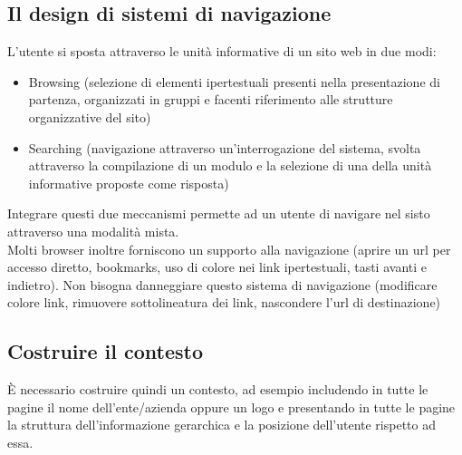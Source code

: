 \documentclass{article}
\begin{document}
\subsection{Il design di sistemi di navigazione}
L'utente si sposta attraverso le unità informative di un sito web in due modi:
\begin{itemize}
	\item Browsing (selezione di elementi ipertestuali presenti nella presentazione di partenza, organizzati in gruppi e facenti riferimento alle strutture organizzative del sito)
	\item Searching (navigazione attraverso un'interrogazione del sistema, svolta attraverso la compilazione di un modulo e la selezione di una della unità informative proposte come risposta)
\end{itemize}
Integrare questi due meccanismi permette ad un utente di navigare nel sisto attraverso una modalità mista.\\
Molti browser inoltre forniscono un supporto alla navigazione (aprire un url per accesso diretto, bookmarks, uso di colore nei link ipertestuali, tasti avanti e indietro). Non bisogna danneggiare questo sistema di navigazione (modificare colore link, rimuovere sottolineatura dei link, nascondere l'url di destinazione)
\subsection{Costruire il contesto}
È necessario costruire quindi un contesto, ad esempio includendo in tutte le pagine il nome dell'ente/azienda oppure un logo e presentando in tutte le pagine la struttura dell'informazione gerarchica e la posizione dell'utente rispetto ad essa.
\end{document}
